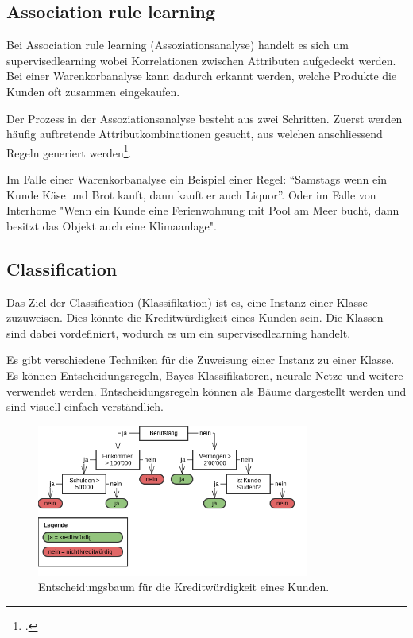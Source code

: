 \subsection{Association rule learning}
\label{sec:recherche:dataminingtechniken:disziplinen:association}
Bei Association rule learning (Assoziationsanalyse) handelt es sich um \gls{supervisedlearning} wobei Korrelationen zwischen Attributen aufgedeckt werden. Bei einer Warenkorbanalyse kann dadurch erkannt werden, welche Produkte die Kunden oft zusammen eingekaufen.

Der Prozess in der Assoziationsanalyse besteht aus zwei Schritten. Zuerst werden häufig auftretende Attributkombinationen gesucht, aus welchen anschliessend Regeln generiert werden\footcite{association_rule_learning_2017-01-05}.

Im Falle einer Warenkorbanalyse ein Beispiel einer Regel: "`Samstags wenn ein Kunde Käse und Brot kauft, dann kauft er auch Liquor"'. Oder im Falle von Interhome "Wenn ein Kunde eine Ferienwohnung mit Pool am Meer bucht, dann besitzt das Objekt auch eine Klimaanlage".

\subsection{Classification}
\label{sec:recherche:dataminingtechniken:disziplinen:classification}
Das Ziel der Classification (Klassifikation) ist es, eine Instanz einer Klasse zuzuweisen. Dies könnte die Kreditwürdigkeit eines Kunden sein. Die Klassen sind dabei vordefiniert, wodurch es um ein \gls{supervisedlearning} handelt.

Es gibt verschiedene Techniken für die Zuweisung einer Instanz zu einer Klasse. Es können Entscheidungsregeln, Bayes-Klassifikatoren, neurale Netze und weitere verwendet werden. Entscheidungsregeln können als Bäume dargestellt werden und sind visuell einfach verständlich.

\begin{figure}[H]
	\centering
	\includegraphics[width=0.8\textwidth]{images/decision_tree.png}
	\caption{Entscheidungsbaum für die Kreditwürdigkeit eines Kunden.}
	\label{fig:recherche:dataminingtechniken:disziplinen:classification}
\end{figure}

